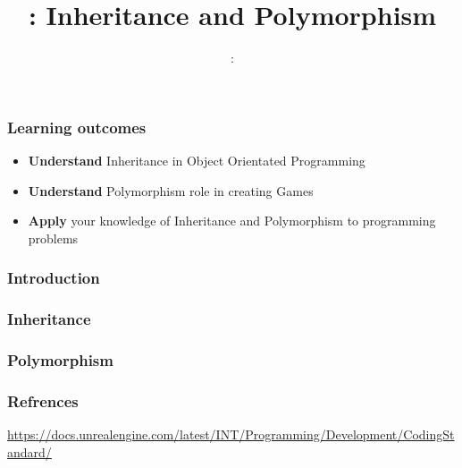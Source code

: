 \usepackage{../../beamerthemeFalmouthGamesAcademy}
\usepackage{multimedia}
\graphicspath{ {../../} }


\usepackage[normalem]{ulem}
\usepackage{wasysym}
\usepackage{listings}
\usepackage{pdfpages}

\usetikzlibrary{arrows,automata}




\title{\sessionnumber: Inheritance and Polymorphism}
\subtitle{\modulecode: \moduletitle}

\frame{\titlepage}

\begin{frame}
	\frametitle{Learning outcomes}
	\begin{itemize}
		\item \textbf{Understand} Inheritance in Object Orientated Programming
		\item \textbf{Understand} Polymorphism role in creating Games
		\item \textbf{Apply} your knowledge of Inheritance and Polymorphism to programming problems
	\end{itemize}
\end{frame}

\begin{frame}
  \frametitle{Introduction}
\end{frame}

\begin{frame}
  \frametitle{Inheritance}
\end{frame}

\begin{frame}
  \frametitle{Polymorphism}
\end{frame}

\begin{frame}
  \frametitle{Refrences}
  \url{https://docs.unrealengine.com/latest/INT/Programming/Development/CodingStandard/}
\end{frame}



